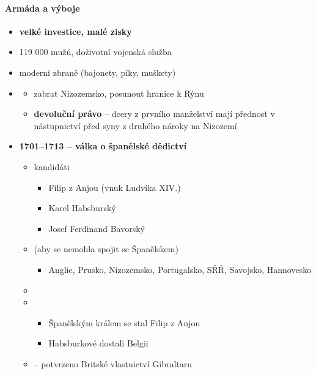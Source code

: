 \paragraph{Armáda a výboje}
\begin{itemize}
\item \textbf{velké investice, malé zisky}
\item 119 000 mužů, doživotní vojenská služba
\item moderní zbraně (bajonety, píky, muškety)
\item \textbf{}
	\begin{itemize}
	\item zabrat Nizozemsko, posunout hranice k Rýnu
	\item \textbf{devoluční právo} -- dcery z prvního manželství mají přednost v nástupnictví před syny z druhého \ra nároky na Nizozemí
	\end{itemize}
\item \textbf{{1701--1713 -- válka o španělské dědictví}}
	\begin{itemize}
	\item kandidáti
		\begin{itemize}
		\item Filip z Anjou (vnuk Ludvíka XIV.)
		\item Karel Habsburský
		\item Josef Ferdinand Bavorský
		\end{itemize}
	\item {} (aby se nemohla spojit se Španělskem)
		\begin{itemize}
		\item Anglie, Prusko, Nizozemsko, Portugalsko, SŘŘ, Savojsko, Hannovesko
		\end{itemize}
	\item {}
	\item {}
		\begin{itemize}
		\item Španělským králem se stal Filip z Anjou
		\item Habsburkové dostali Belgii
		\end{itemize}
	\item {}  -- potvrzeno Britské vlastnictví Gibraltaru

	\end{itemize}
\end{itemize}



